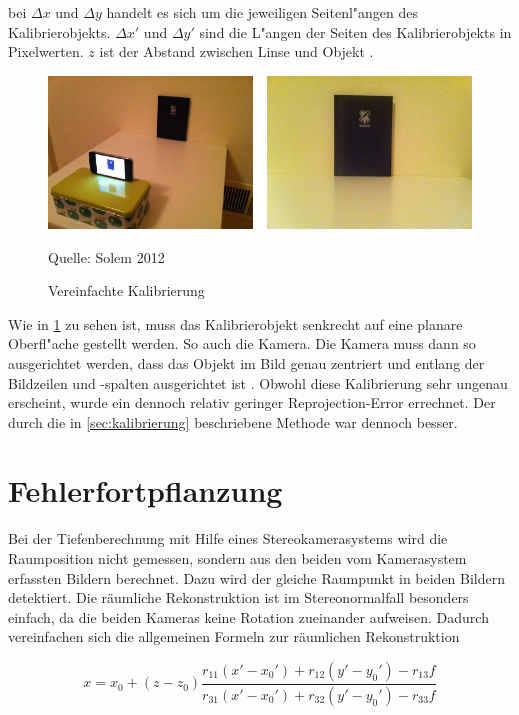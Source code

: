 \noindent bei $\Delta x$ und $\Delta y$ handelt es sich um die jeweiligen Seitenl"angen des Kalibrierobjekts.\newline
$\Delta x'$ und $\Delta y'$ sind die L"angen der Seiten des Kalibrierobjekts in Pixelwerten. $z$ ist der Abstand zwischen Linse und Objekt \cite{PCV} \cite{CVF}.

\begin{figure}[H]
	\includegraphics[scale=1.0]{bilder/simple_calib}
	\caption[Vereinfachte Kalibrierung]{Vereinfachte Kalibrierung}
	\small Quelle: Solem 2012
	\label{fig:simplecalib}%
\end{figure}

\noindent Wie in \ref{fig:simplecalib} zu sehen ist, muss das Kalibrierobjekt senkrecht auf eine planare Oberfl"ache gestellt werden. So auch die Kamera. Die Kamera muss dann so ausgerichtet werden, dass das Objekt im Bild genau zentriert und entlang der Bildzeilen und -spalten ausgerichtet ist \cite{CVF}.\newline
Obwohl diese Kalibrierung sehr ungenau erscheint, wurde ein dennoch relativ geringer Reprojection-Error errechnet. Der durch die in \ref{sec:kalibrierung} beschriebene Methode war dennoch besser.

\section{Fehlerfortpflanzung}
\label{sec:fehlerfortpflanzungtiefen}

Bei der Tiefenberechnung mit Hilfe eines Stereokamerasystems wird die Raumposition nicht gemessen, sondern aus den beiden vom Kamerasystem erfassten Bildern berechnet. Dazu wird der gleiche Raumpunkt in beiden Bildern detektiert. Die räumliche Rekonstruktion ist im Stereonormalfall besonders einfach, da die beiden Kameras keine Rotation zueinander aufweisen. Dadurch vereinfachen sich die allgemeinen Formeln zur räumlichen Rekonstruktion \cite{frz}

\begin{equation}
x = x_{0} + (z - z_{0})\frac
{r_{11}(x'-x_{0}') + r_{12}(y'-y_{0}')-r_{13}f}
{r_{31}(x'-x_{0}') + r_{32}(y'-y_{0}')-r_{33}f}
\end{equation}

